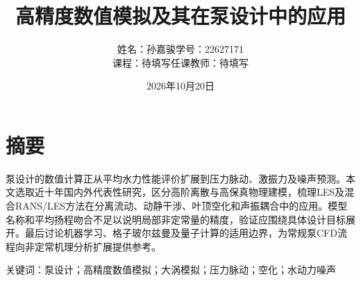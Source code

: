 \documentclass{coursepaper}
\title{高精度数值模拟及其在泵设计中的应用}
\author{姓名：孙嘉骏\quad 学号：22627171\\课程：待填写\quad 任课教师：待填写}
\date{2026年10月20日}
\begin{document}
\maketitle

\section*{摘要}
泵设计的数值计算正从平均水力性能评价扩展到压力脉动、激振力及噪声预测。本文选取近十年国内外代表性研究，区分高阶离散与高保真物理建模，梳理LES及混合RANS/LES方法在分离流动、动静干涉、叶顶空化和声振耦合中的应用。模型名称和平均扬程吻合不足以说明局部非定常量的精度，验证应围绕具体设计目标展开。最后讨论机器学习、格子玻尔兹曼及量子计算的适用边界，为常规泵CFD流程向非定常机理分析扩展提供参考。

\noindent 关键词：泵设计；高精度数值模拟；大涡模拟；压力脉动；空化；水动力噪声




\printbibliography[title={参考文献}]
\end{document}
